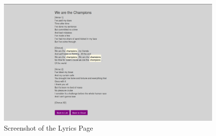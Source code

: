 \documentclass[]{article}
\begin{document}
\begin{figure}[htbp]
\centering
\includegraphics{SongPage.png}
\caption{Screenshot of the Lyrics Page}
\end{figure}
\end{document}
